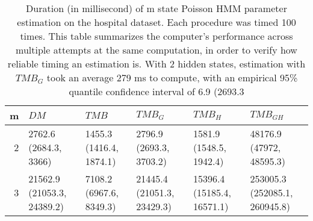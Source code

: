 \documentclass[bimj,fleqn]{w-art}\usepackage[]{graphicx}\usepackage[]{color}
\theoremstyle{plain}
\theoremstyle{definition}
\begin{document}
\begin{table}[ht]
\centering
\begin{tabular}{rlllll}
  \hline
m & \textit{${DM}$} & \textit{${TMB}$} & \textit{${TMB_G}$} & \textit{${TMB_H}$} & \textit{${TMB_{GH}}$} \\ 
  \hline
2 & 2762.6 (2684.3, 3366) & 1455.3 (1416.4, 1874.1) & 2796.9 (2693.3, 3703.2) & 1581.9 (1548.5, 1942.4) & 48176.9 (47972, 48595.3) \\ 
  3 & 21562.9 (21053.3, 24389.2) & 7108.2 (6967.6, 8349.3) & 21445.4 (21051.3, 23429.3) & 15396.4 (15185.4, 16571.1) & 253005.3 (252085.1, 260945.8) \\ 
   \hline
\end{tabular}
\caption{Duration (in millisecond) of m state Poisson HMM parameter estimation on the hospital dataset. Each procedure was timed 100 times. This table summarizes the computer's performance across multiple attempts at the same computation, in order to verify how reliable timing an estimation is. With 2 hidden states, estimation with $TMB_G$ took an average 279 ms to compute, with an empirical 95\% quantile confidence interval of 6.9 (2693.3} 
\label{table:speed-consistency-hosp}
\end{table}
\end{document}
